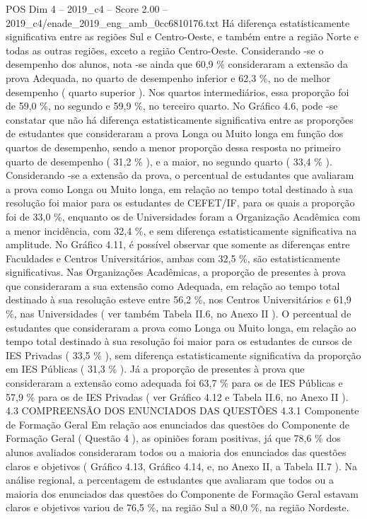 \begin{textsample}{POS Dim 4 – 2019\_c4 – Score 2.00 – 2019\_c4/enade\_2019\_eng\_amb\_0cc6810176.txt}
Há diferença estatisticamente significativa entre as regiões Sul e Centro-Oeste, e também entre a região Norte e todas as outras regiões, exceto a região Centro-Oeste.
Considerando -se o desempenho dos alunos, nota -se ainda que 60,9 \% consideraram a extensão da prova Adequada, no quarto de desempenho inferior e 62,3 \%, no de melhor desempenho ( quarto superior ).
Nos quartos intermediários, essa proporção foi de 59,0 \%, no segundo e 59,9 \%, no terceiro quarto.
No Gráfico 4.6, pode -se constatar que não há diferença estatisticamente significativa entre as proporções de estudantes que consideraram a prova Longa ou Muito longa em função dos quartos de desempenho, sendo a menor proporção dessa resposta no primeiro quarto de desempenho ( 31,2 \% ), e a maior, no segundo quarto ( 33,4 \% ).
Considerando -se a extensão da prova, o percentual de estudantes que avaliaram a prova como Longa ou Muito longa, em relação ao tempo total destinado à sua resolução foi maior para os estudantes de CEFET/IF, para os quais a proporção foi de 33,0 \%, enquanto os de Universidades foram a Organização Acadêmica com a menor incidência, com 32,4 \%, e sem diferença estatisticamente significativa na amplitude.
No Gráfico 4.11, é possível observar que somente as diferenças entre Faculdades e Centros Universitários, ambas com 32,5 \%, são estatisticamente significativas.
Nas Organizações Acadêmicas, a proporção de presentes à prova que consideraram a sua extensão como Adequada, em relação ao tempo total destinado à sua resolução esteve entre 56,2 \%, nos Centros Universitários e 61,9 \%, nas Universidades ( ver também Tabela II.6, no Anexo II ).
O percentual de estudantes que consideraram a prova como Longa ou Muito longa, em relação ao tempo total destinado à sua resolução foi maior para os estudantes de cursos de IES Privadas ( 33,5 \% ), sem diferença estatisticamente significativa da proporção em IES Públicas ( 31,3 \% ).
Já a proporção de presentes à prova que consideraram a extensão como adequada foi 63,7 \% para os de IES Públicas e 57,9 \% para os de IES Privadas ( ver Gráfico 4.12 e Tabela II.6, no Anexo II ). 4.3 COMPREENSÃO DOS ENUNCIADOS DAS QUESTÕES 4.3.1 Componente de Formação Geral Em relação aos enunciados das questões do Componente de Formação Geral ( Questão 4 ), as opiniões foram positivas, já que 78,6 \% dos alunos avaliados consideraram todos ou a maioria dos enunciados das questões claros e objetivos ( Gráfico 4.13, Gráfico 4.14, e, no Anexo II, a Tabela II.7 ).
Na análise regional, a percentagem de estudantes que avaliaram que todos ou a maioria dos enunciados das questões do Componente de Formação Geral estavam claros e objetivos variou de 76,5 \%, na região Sul a 80,0 \%, na região Nordeste.

\end{textsample}

